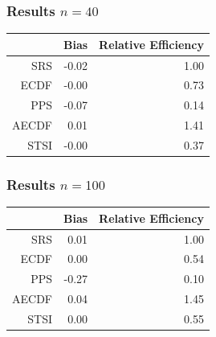 \documentclass{beamer}
\begin{document}
%
\begin{frame}
  \frametitle{Results $n = 40$}
  \begin{table}[ht]
  \centering
  \begin{tabular}{rrr}
    \hline
    & Bias & Relative Efficiency \\ 
    \hline
    SRS & -0.02 & 1.00 \\ 
    ECDF & -0.00 & 0.73 \\ 
    PPS & -0.07 & 0.14 \\ 
    AECDF & 0.01 & 1.41 \\ 
    STSI & -0.00 & 0.37 \\ 
     \hline
  \end{tabular}
  \end{table} 
\end{frame}
%
\begin{frame}
  \frametitle{Results $n = 100$}
  \begin{table}[ht]
  \centering
  \begin{tabular}{rrr}
    \hline
    & Bias & Relative Efficiency \\ 
   \hline
    SRS & 0.01 & 1.00 \\ 
    ECDF & 0.00 & 0.54 \\ 
    PPS & -0.27 & 0.10 \\ 
    AECDF & 0.04 & 1.45 \\ 
    STSI & 0.00 & 0.55 \\ 
   \hline
  \end{tabular}
  \end{table}
\end{frame}
%
\end{document}
